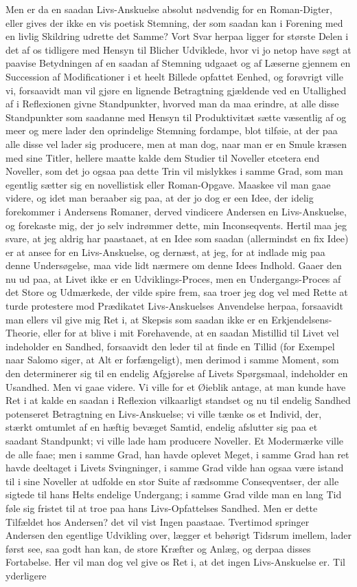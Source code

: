 \documentclass[12pt,a4paper]{article}
\begin{document}
Men er da en saadan Livs-Anskuelse absolut nødvendig for en Roman-Digter, eller gives der ikke en vis poetisk Stemning, der som saadan kan i Forening med en livlig Skildring udrette det Samme? Vort Svar herpaa ligger for største Delen i det af os tidligere med Hensyn til Blicher Udviklede, hvor vi jo netop have søgt at paavise Betydningen af en saadan af Stemning udgaaet og af Læserne gjennem en Succession af Modificationer i et heelt Billede opfattet Eenhed, og forøvrigt ville vi, forsaavidt man vil gjøre en lignende Betragtning gjældende ved en Utallighed af i Reflexionen givne Standpunkter, hvorved man da maa erindre, at alle disse Standpunkter som saadanne med Hensyn til Produktivitæt sætte væsentlig af og meer og mere lader den oprindelige Stemning fordampe, blot tilføie, at der paa alle disse vel lader sig producere, men at man dog, naar man er en Smule kræsen med sine Titler, hellere maatte kalde dem Studier til Noveller etcetera end Noveller, som det jo ogsaa paa dette Trin vil mislykkes i samme Grad, som man egentlig sætter sig en novellistisk eller Roman-Opgave. Maaskee vil man gaae videre, og idet man beraaber sig paa, at der jo dog er een Idee, der idelig forekommer i Andersens Romaner, derved vindicere Andersen en Livs-Anskuelse, og forekaste mig, der jo selv indrømmer dette, min Inconseqvents. Hertil maa jeg svare, at jeg aldrig har paastaaet, at en Idee som saadan (allermindst en fix Idee) er at ansee for en Livs-Anskuelse, og dernæst, at jeg, for at indlade mig paa denne Undersøgelse, maa vide lidt nærmere om denne Idees Indhold. Gaaer den nu ud paa, at Livet ikke er en Udviklings-Proces, men en Undergangs-Proces af det Store og Udmærkede, der vilde spire frem, saa troer jeg dog vel med Rette at turde protestere mod Prædikatet Livs-Anskuelses Anvendelse herpaa, forsaavidt man ellers vil give mig Ret i, at Skepsis som saadan ikke er en Erkjendelsens-Theorie, eller for at blive i mit Forehavende, at en saadan Mistillid til Livet vel indeholder en Sandhed, forsaavidt den leder til at finde en Tillid (for Exempel naar Salomo siger, at Alt er forfængeligt), men derimod i samme Moment, som den determinerer sig til en endelig Afgjørelse af Livets Spørgsmaal, indeholder en Usandhed. Men vi gaae videre. Vi ville for et Øieblik antage, at man kunde have Ret i at kalde en saadan i Reflexion vilkaarligt standset og nu til endelig Sandhed potenseret Betragtning en Livs-Anskuelse; vi ville tænke os et Individ, der, stærkt omtumlet af en hæftig bevæget Samtid, endelig afslutter sig paa et saadant Standpunkt; vi ville lade ham producere Noveller. Et Modermærke ville de alle faae; men i samme Grad, han havde oplevet Meget, i samme Grad han ret havde deeltaget i Livets Svingninger, i samme Grad vilde han ogsaa være istand til i sine Noveller at udfolde en stor Suite af rædsomme Conseqventser, der alle sigtede til hans Helts endelige Undergang; i samme Grad vilde man en lang Tid føle sig fristet til at troe paa hans Livs-Opfattelses Sandhed. Men er dette Tilfældet hos Andersen? det vil vist Ingen paastaae. Tvertimod springer Andersen den egentlige Udvikling over, lægger et behørigt Tidsrum imellem, lader først see, saa godt han kan, de store Kræfter og Anlæg, og derpaa disses Fortabelse. Her vil man dog vel give os Ret i, at det ingen Livs-Anskuelse er. Til yderligere 
\end{document}
